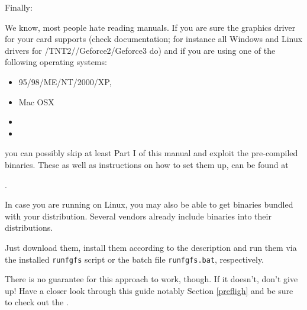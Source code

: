 \noindent 
Finally:
\medskip


We know, most people hate reading manuals. If you are sure the graphics driver for your card supports  (check documentation; for instance all  Windows and Linux drivers for /TNT2//Geforce2/Geforce3 do) and if you are using one of the following operating systems:

\begin{itemize}
\item {} 95/98/ME/NT/2000/XP,
\item {} Mac OSX
\item {}
\item {}
\end{itemize}

 \noindent
you can possibly skip at least Part I of this manual and exploit the pre-compiled binaries. These as well as instructions on how to set them up, can be found at
 \medskip

.
 \medskip

 \noindent
In case you are running \FlightGear{} on Linux, you may also be able to get binaries bundled with your distribution. Several vendors already include \FlightGear{}  binaries into their distributions.
 
Just download them, install them according to the description and run them via the installed \texttt{runfgfs} script or the batch file \texttt{runfgfs.bat}, respectively.

There is no guarantee for this approach to work, though. If it doesn't, don't give up! Have a closer look through this guide notably Section \ref{prefligh} and be sure to check out the .


